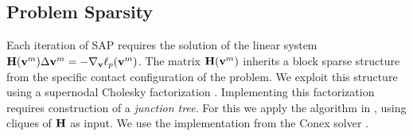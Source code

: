 \subsection{Problem Sparsity}
\label{sec:problem_sparsity}




Each iteration of SAP requires the solution of the linear system
${\mathbf{H}}({\mathbf{v}}^m)\Delta{\mathbf{v}}^{m} = -\nabla_{\mathbf{v}}\ell_p({\mathbf{v}}^m)$.
The matrix ${\mathbf{H}}({\mathbf{v}}^m)$ inherits a block sparse structure from
the specific contact configuration of the problem. 
We exploit this structure using a supernodal Cholesky factorization \cite[\S
9]{bib:davis2016survey}. Implementing this factorization requires construction
of a \emph{junction tree}.  For this we apply the algorithm in
\cite{bib:smail2017junction}, using cliques of ${\mathbf{H}}$ as input. We
use the implementation from the Conex solver \cite{bib:permenter2020}.

